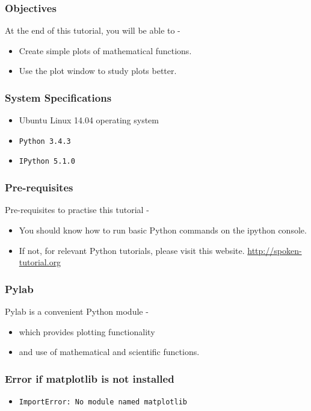 \documentclass[17pt]{beamer}
\begin{document}
\begin{frame}
   \titlepage
\end{frame}
\begin{frame}
\frametitle{Objectives}
\label{sec-2}
At the end of this tutorial, you will be able to -\pause
\begin{itemize}
\item Create simple plots of mathematical functions. \pause
\item Use the plot window to study plots better.
\end{itemize}
\end{frame}
\begin{frame}
\frametitle{System Specifications}\pause
\begin{itemize}
\item Ubuntu Linux 14.04 operating system\pause
\item \texttt{Python 3.4.3} \pause
\item \texttt{IPython 5.1.0}
\end{itemize}
\end{frame}
\begin{frame}
\frametitle{Pre-requisites}
Pre-requisites to practise this tutorial -
\begin{itemize}
\item You should know how to run basic Python commands on the  ipython console.
\item If not, for relevant Python tutorials, please visit this website.
{\color{blue}\url{http://spoken-tutorial.org}}
\end{itemize}
\end{frame}
\begin{frame}
\frametitle{Pylab}
Pylab is a convenient Python module -\pause
\begin{itemize}
\item which provides plotting functionality\pause
\item and use of mathematical and scientific functions.
\end{itemize}
\end{frame}
\begin{frame}
\frametitle{Error if matplotlib is not installed}
\label{sec-3}
\begin{itemize}
\item \texttt{ImportError: No module named matplotlib}\\
\label{sec-3_1}%
\end{itemize} %
\end{frame}
\end{document}
